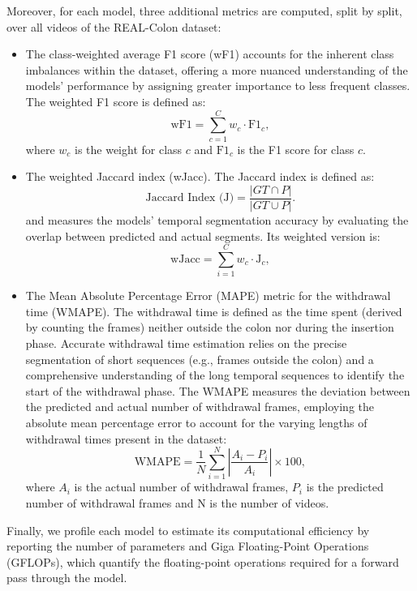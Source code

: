 Moreover, for each model, three additional metrics are computed, split by split, over all videos of the REAL-Colon dataset:

\begin{itemize} 
    \item The class-weighted average F1 score (wF1) accounts for the inherent class imbalances within the dataset, offering a more nuanced understanding of the models' performance by assigning greater importance to less frequent classes. The weighted F1 score is defined as:
    \[
    \text{wF1} = \sum_{c=1}^{C} w_c \cdot \text{F1}_c,
    \]
    where \(w_c\) is the weight for class \(c\) and \(\text{F1}_c\) is the F1 score for class \(c\).
    
    \item The weighted Jaccard index (wJacc). The Jaccard index is defined as:
    \[
    \text{Jaccard Index (J)} = \frac{|GT \cap P|}{|GT \cup P|}.
    \]
    and measures the models' temporal segmentation accuracy by evaluating the overlap between predicted and actual segments. Its weighted version is:
    \[
    \text{wJacc} = \sum_{i=1}^{C} w_c \cdot \text{J}_c,
    \]
    
    \item The Mean Absolute Percentage Error (MAPE) metric for the withdrawal time (WMAPE). The withdrawal time is defined as the time spent (derived by counting the frames) neither outside the colon nor during the insertion phase. Accurate withdrawal time estimation relies on the precise segmentation of short sequences (e.g., frames outside the colon) and a comprehensive understanding of the long temporal sequences to identify the start of the withdrawal phase. The WMAPE measures the deviation between the predicted and actual number of withdrawal frames, employing the absolute mean percentage error to account for the varying lengths of withdrawal times present in the dataset:
    \[
    \text{WMAPE} = \frac{1}{N} \sum_{i=1}^{N} \left| \frac{A_i - P_i}{A_i} \right| \times 100,
    \]
    where \(A_i\) is the actual number of withdrawal frames, \(P_i\) is the predicted number of withdrawal frames and N is the number of videos.
\end{itemize}

Finally, we profile each model to estimate its computational efficiency by reporting the number of parameters and Giga Floating-Point Operations (GFLOPs), which quantify the floating-point operations required for a forward pass through the model.